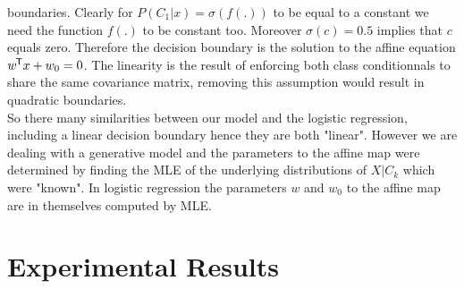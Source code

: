 boundaries.
Clearly for $P(C_1\vert x) = \sigma(f(.))$ to be equal to a constant we need the 
function $f(.)$ to be constant too. Moreover $\sigma(c) = 0.5$ implies 
that $c$ equals zero. Therefore the decision boundary is the solution to
the affine equation $w^{\mkern-1.5mu\mathsf{T}} x + w_0 = 0$. The linearity is the result of
enforcing both class conditionnals to share the same covariance matrix, 
removing this assumption would result in quadratic boundaries.\\
So there many similarities between our model and the logistic regression,
including a linear decision boundary hence they are both "linear".
However we are dealing with a generative model and the parameters 
to the affine map were determined by finding the MLE of the underlying
distributions of $X \vert C_k$ which were "known". 
In logistic regression the parameters $w$ and $w_0$ to the affine map
are in themselves computed by MLE. 
\clearpage

\section{Experimental Results}
